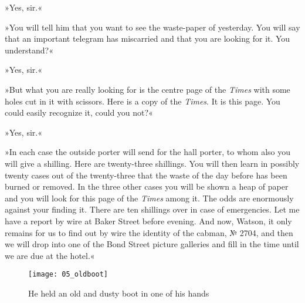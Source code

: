 »Yes, sir.«

»You will tell him that you want to see the waste-paper of yesterday. You will say that an important telegram has miscarried and that you are looking for it. You understand?«

»Yes, sir.«

»But what you are really looking for is the centre page of the \textit{Times} with some holes cut in it with scissors. Here is a copy of the \textit{Times}. It is this page. You could easily recognize it, could you not?«

»Yes, sir.«

»In each case the outside porter will send for the hall porter, to whom also you will give a shilling. Here are twenty-three shillings. You will then learn in possibly twenty cases out of the twenty-three that the waste of the day before has been burned or removed. In the three other cases you will be shown a heap of paper and you will look for this page of the \textit{Times} among it. The odds are enormously against your finding it. There are ten shillings over in case of emergencies. Let me have a report by wire at Baker Street before evening. And now, Watson, it only remains for us to find out by wire the identity of the cabman, № 2704, and then we will drop into one of the Bond Street picture galleries and fill in the time until we are due at the hotel.«

\makeatletter
{}
{%
}{%
	\begin{figure}[p]
	\centering
	\texttt{[image: 05\_oldboot]}
	\caption{He held an old and dusty boot in one of his hands}
	\end{figure}
}
\makeatother

